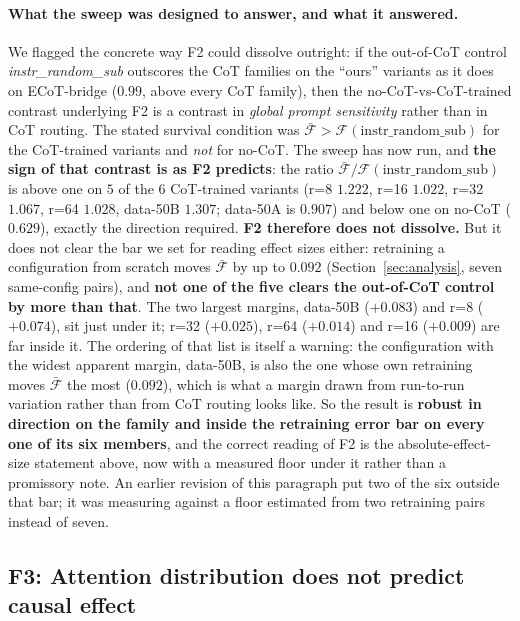 \documentclass{article}
\begin{document}
\paragraph{What the sweep was designed to answer, and what it answered.} We flagged the concrete way F2 could dissolve outright: if the out-of-CoT control \emph{instr\_random\_sub} outscores the CoT families on the ``ours'' variants as it does on ECoT-bridge ($0.99$, above every CoT family), then the no-CoT-vs-CoT-trained contrast underlying F2 is a contrast in \emph{global prompt sensitivity} rather than in CoT routing. The stated survival condition was $\bar{\mathcal{F}} > \mathcal{F}(\text{instr\_random\_sub})$ for the CoT-trained variants and \emph{not} for no-CoT. The sweep has now run, and \textbf{the sign of that contrast is as F2 predicts}: the ratio $\bar{\mathcal{F}}/\mathcal{F}(\text{instr\_random\_sub})$ is above one on $5$ of the $6$ CoT-trained variants (r=8 $1.222$, r=16 $1.022$, r=32 $1.067$, r=64 $1.028$, data-50B $1.307$; data-50A is $0.907$) and below one on no-CoT ($0.629$), exactly the direction required. \textbf{F2 therefore does not dissolve.} But it does not clear the bar we set for reading effect sizes either: retraining a configuration from scratch moves $\bar{\mathcal{F}}$ by up to $0.092$ (Section~\ref{sec:analysis}, seven same-config pairs), and \textbf{not one of the five clears the out-of-CoT control by more than that}. The two largest margins, data-50B ($+0.083$) and r=8 ($+0.074$), sit just under it; r=32 ($+0.025$), r=64 ($+0.014$) and r=16 ($+0.009$) are far inside it. The ordering of that list is itself a warning: the configuration with the widest apparent margin, data-50B, is also the one whose own retraining moves $\bar{\mathcal{F}}$ the most ($0.092$), which is what a margin drawn from run-to-run variation rather than from CoT routing looks like. So the result is \textbf{robust in direction on the family and inside the retraining error bar on every one of its six members}, and the correct reading of F2 is the absolute-effect-size statement above, now with a measured floor under it rather than a promissory note. An earlier revision of this paragraph put two of the six outside that bar; it was measuring against a floor estimated from two retraining pairs instead of seven.

\subsection{F3: Attention distribution does not predict causal effect}
\end{document}
